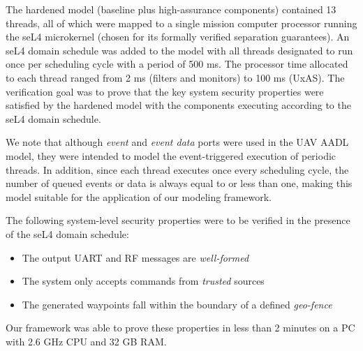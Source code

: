 The hardened model (baseline plus high-assurance components) contained 13 threads,
all of which were mapped to a single mission computer processor running the seL4 microkernel (chosen for its formally verified separation guarantees).
An seL4 domain schedule was added to the model with all threads designated to run once per scheduling cycle with a period of 500 ms.
The processor time allocated to each thread ranged from 2 ms (filters and monitors) to 100 ms (UxAS).
The verification goal was to prove that the key system security properties were satisfied by the hardened model with the components executing according to the seL4 domain schedule.

We note that although \textit{event} and \textit{event data} ports were used in the UAV AADL model, they were intended to model the event-triggered execution of periodic threads.
In addition, since each thread executes once every scheduling cycle, the number of queued events or data is always equal to or less than one,
making this model suitable for the application of our modeling framework.

The following system-level security properties were to be verified in the presence of the seL4 domain schedule:
\begin{itemize}
	\item The output UART and RF messages are \emph{well-formed}
	\item The system only accepts commands from \emph{trusted} sources
	\item The generated waypoints fall within the boundary of a defined \emph{geo-fence}
\end{itemize}
Our framework was able to prove these properties in less than 2 minutes on a PC with 2.6 GHz CPU and 32 GB RAM.

